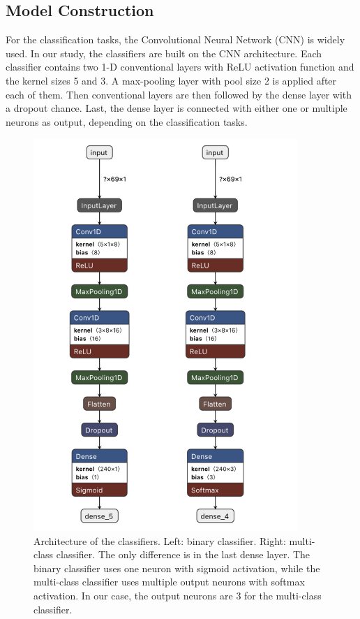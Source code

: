 \subsection{Model Construction}

For the classification tasks, the Convolutional Neural Network (CNN) is widely used. In our study, the classifiers are built on the CNN architecture.
Each classifier contains two 1-D conventional layers with ReLU activation function and the kernel sizes 5 and 3. 
A max-pooling layer with pool size 2 is applied after each of them. Then conventional layers are then followed by the dense layer with a dropout chance.
Last, the dense layer is connected with either one or multiple neurons as output, depending on the classification tasks.

\begin{figure}[ht]
    \centering
    \includegraphics[width= 10cm]{figures/models.png}
        \caption{Architecture of the classifiers. Left: binary classifier. Right: multi-class classifier. 
        The only difference is in the last dense layer. The binary classifier uses one neuron with sigmoid activation, 
        while the multi-class classifier uses multiple output neurons with softmax activation. In our case, the output neurons are 3 for the multi-class classifier.}
    \label{fig:models}
\end{figure}

